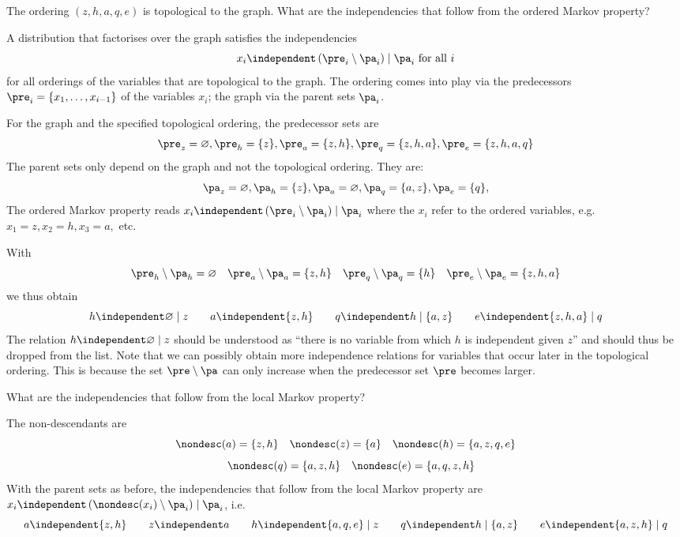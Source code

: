   \begin{exenumerate}
  \item The ordering $(z,h,a,q,e)$ is topological to the graph. What are the independencies that follow from the ordered Markov property?

    \begin{solution}
    A distribution that factorises over the graph satisfies the independencies
    $$ x_i \independent \left(\pre_i \setminus \pa_i\right) \mid \pa_i \text{ for all } i$$
    for all orderings of the variables that are topological to the graph. The ordering comes into play via the predecessors $\pre_i = \{x_1, \ldots, x_{i-1}\}$ of the variables $x_i$; the graph via the parent sets $\pa_i$.

  For the graph and the specified topological ordering, the predecessor sets are
      $$\pre_z = \varnothing, \pre_h = \{z\}, \pre_a = \{z,h\}, \pre_q = \{z,h,a\}, \pre_e =\{z,h,a,q\}$$
      The parent sets only depend on the graph and not the topological ordering. They are:
      $$\pa_z = \varnothing, \pa_h = \{z\}, \pa_a = \varnothing, \pa_q =\{a,z\}, \pa_e = \{q\}, $$
      The ordered Markov property reads  $x_i \independent \left(\pre_i \setminus \pa_i \right)\mid \pa_i$ where the $x_i$ refer to the ordered variables, e.g.\ $x_1 = z, x_2 = h, x_3 = a,$ etc.

      With
      $$ \pre_h \setminus \pa_h = \varnothing \quad \pre_a \setminus \pa_a = \{z,h\} \quad \pre_q \setminus \pa_q = \{h\} \quad \pre_e \setminus \pa_e = \{z,h,a\}$$
      we thus obtain
      $$ h \independent \varnothing \mid z \quad \quad
      a \independent \{z,h\} \quad \quad q \independent
      h \mid \{a,z\} \quad \quad e \independent \{z,h,a\} \mid q$$ The
      relation $ h \independent \varnothing \mid z$ should be understood as
      ``there is no variable from which $h$ is independent given $z$'' and
      should thus be dropped from the list. Note that we can possibly
      obtain more independence relations for variables that occur later in
      the topological ordering. This is because the set
      $\pre \setminus \pa$ can only increase when the predecessor set
      $\pre$ becomes larger.
      \end{solution}
    
  \item What are the independencies that follow from the local Markov property?

    \begin{solution}
      The non-descendants are
      $$\nondesc(a) = \{z,h\} \quad \nondesc(z) = \{a\} \quad \nondesc(h) = \{a,z,q,e\}$$
      $$\quad \nondesc(q) = \{a,z,h\} \quad \nondesc(e) = \{a,q,z,h\}$$
With the parent sets as before, the independencies that follow from the local Markov property are $x_i \independent \left( \nondesc(x_i)\setminus \pa_i \right) \mid \pa_i$, i.e.\:
      $$a \independent \{z,h\} \quad \quad z \independent a \quad \quad h \independent \{a,q,e\} \mid z \quad \quad q \independent  h \mid \{a,z\} \quad \quad e \independent \{a,z,h\} \mid q$$
      


\end{solution}
\end{exenumerate}
